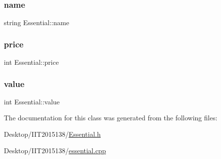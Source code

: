 \subsubsection{\texorpdfstring{name}{name}}
{\footnotesize\ttfamily string Essential\+::name\hspace{0.3cm}{\ttfamily [private]}}

\mbox{\label{classEssential_aea9b892763058d183a3a6fdc74501e09}} 
\subsubsection{\texorpdfstring{price}{price}}
{\footnotesize\ttfamily int Essential\+::price\hspace{0.3cm}{\ttfamily [private]}}

\mbox{\label{classEssential_a65c36b046d68a89c494e87859f49afc7}} 
\subsubsection{\texorpdfstring{value}{value}}
{\footnotesize\ttfamily int Essential\+::value\hspace{0.3cm}{\ttfamily [private]}}



The documentation for this class was generated from the following files\+:\begin{DoxyCompactItemize}
\item 
Desktop/\+I\+I\+T2015138/\hyperlink{Essential_8h}{Essential.\+h}\item 
Desktop/\+I\+I\+T2015138/\hyperlink{essential_8cpp}{essential.\+cpp}\end{DoxyCompactItemize}
